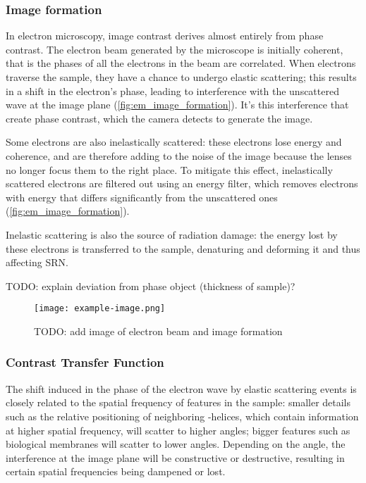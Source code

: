 \subsubsection{Image formation}

In electron microscopy, image contrast derives almost entirely from phase contrast.
The electron beam generated by the microscope is initially coherent, that is the phases of all the electrons in the beam are correlated.
When electrons traverse the sample, they have a chance to undergo elastic scattering; this results in a shift in the electron's phase, leading to interference with the unscattered wave at the image plane (\autoref{fig:em_image_formation}).
It's this interference that create phase contrast, which the camera detects to generate the image.

Some electrons are also inelastically scattered: these electrons lose energy and coherence, and are therefore adding to the noise of the image because the lenses no longer focus them to the right place.
To mitigate this effect, inelastically scattered electrons are filtered out using an energy filter, which removes electrons with energy that differs significantly from the unscattered ones (\autoref{fig:em_image_formation}).

Inelastic scattering is also the source of radiation damage: the energy lost by these electrons is transferred to the sample, denaturing and deforming it and thus affecting SRN.

TODO: explain deviation from phase object (thickness of sample)?

\begin{figure}[ht]
    \centering
    \texttt{[image: example-image.png]}
    \caption[Image formation in cryo-EM]{TODO: add image of electron beam and image formation}
    \label{fig:em_image_formation}
\end{figure}

\subsubsection{Contrast Transfer Function}\label{em_ctf}
The shift induced in the phase of the electron wave by elastic scattering events is closely related to the spatial frequency of features in the sample: smaller details such as the relative positioning of neighboring \alpha-helices, which contain information at higher spatial frequency, will scatter to higher angles; bigger features such as biological membranes will scatter to lower angles.
Depending on the angle, the interference at the image plane will be constructive or destructive, resulting in certain spatial frequencies being dampened or lost.

